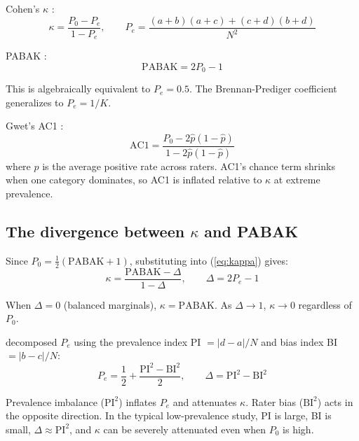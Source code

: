 \documentclass[11pt]{article}
\begin{document}
Cohen's $\kappa$ \citep{cohen1960coefficient}:
\begin{equation}
\kappa = \frac{P_0 - P_e}{1 - P_e}, \qquad P_e = \frac{(a+b)(a+c) + (c+d)(b+d)}{N^2}
\label{eq:kappa}
\end{equation}

PABAK \citep{byrt1993bias}:
\begin{equation}
\text{PABAK} = 2P_0 - 1
\label{eq:pabak}
\end{equation}

This is algebraically equivalent to $P_e = 0.5$. The Brennan-Prediger coefficient \citep{brennan1981coefficient} generalizes to $P_e = 1/K$.

Gwet's AC1 \citep{gwet2008computing}:
\begin{equation}
\text{AC1} = \frac{P_0 - 2\hat{p}(1-\hat{p})}{1 - 2\hat{p}(1-\hat{p})}
\label{eq:ac1}
\end{equation}
where $\hat{p}$ is the average positive rate across raters. AC1's chance term shrinks when one category dominates, so AC1 is inflated relative to $\kappa$ at extreme prevalence.

\subsection*{The divergence between $\kappa$ and PABAK}

Since $P_0 = \tfrac{1}{2}(\text{PABAK} + 1)$, substituting into (\ref{eq:kappa}) gives:
\begin{equation}
\kappa = \frac{\text{PABAK} - \Delta}{1 - \Delta}, \qquad \Delta = 2P_e - 1
\label{eq:divergence}
\end{equation}

When $\Delta = 0$ (balanced marginals), $\kappa = \text{PABAK}$. As $\Delta \to 1$, $\kappa \to 0$ regardless of $P_0$.

\citet{byrt1993bias} decomposed $P_e$ using the prevalence index PI $= |d-a|/N$ and bias index BI $= |b-c|/N$:
\begin{equation}
P_e = \frac{1}{2} + \frac{\text{PI}^2 - \text{BI}^2}{2}, \qquad \Delta = \text{PI}^2 - \text{BI}^2
\label{eq:delta_decomp}
\end{equation}

Prevalence imbalance ($\text{PI}^2$) inflates $P_e$ and attenuates $\kappa$. Rater bias ($\text{BI}^2$) acts in the opposite direction. In the typical low-prevalence study, PI is large, BI is small, $\Delta \approx \text{PI}^2$, and $\kappa$ can be severely attenuated even when $P_0$ is high.
\end{document}
